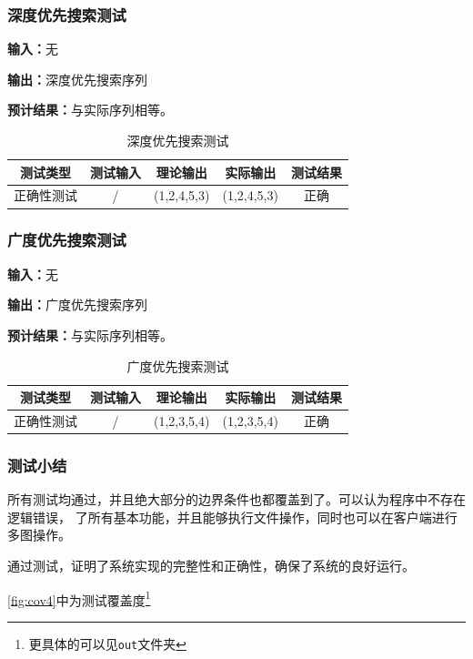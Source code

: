 \subsubsection{深度优先搜索测试}
\textbf{输入：}无
\par
\textbf{输出：}深度优先搜索序列
\par
\textbf{预计结果：}与实际序列相等。
\begin{table}[h]
    \caption{深度优先搜索测试}
    \centering
    \begin{tabular}{@{}ccccc@{}}
        \toprule
        \multicolumn{1}{c}{测试类型}    & \multicolumn{1}{c}{测试输入} & \multicolumn{1}{c}{理论输出} & \multicolumn{1}{c}{实际输出} &
        \multicolumn{1}{c}{测试结果} \\ \midrule
        \multicolumn{1}{c|}{正确性测试}  & /&(1,2,4,5,3)&(1,2,4,5,3)&正确\\ \bottomrule
    \end{tabular}
    \label{tab:traversetest4}
\end{table}
\subsubsection{广度优先搜索测试}
\textbf{输入：}无
\par
\textbf{输出：}广度优先搜索序列
\par
\textbf{预计结果：}与实际序列相等。
\begin{table}[h]
    \caption{广度优先搜索测试}
    \centering
    \begin{tabular}{@{}ccccc@{}}
        \toprule
        \multicolumn{1}{c}{测试类型}    & \multicolumn{1}{c}{测试输入} & \multicolumn{1}{c}{理论输出} & \multicolumn{1}{c}{实际输出} &
        \multicolumn{1}{c}{测试结果} \\ \midrule
        \multicolumn{1}{c|}{正确性测试}  & /&(1,2,3,5,4)&(1,2,3,5,4)&正确\\ \bottomrule
    \end{tabular}
    \label{tab:bfs4}
\end{table}

\subsubsection{测试小结}
所有测试均通过，并且绝大部分的边界条件也都覆盖到了。可以认为程序中不存在逻辑错误，
了所有基本功能，并且能够执行文件操作，同时也可以在客户端进行多图操作。
\par
通过测试，证明了系统实现的完整性和正确性，确保了系统的良好运行。
\par
\autoref{fig:cov4}中为测试覆盖度\footnote{更具体的可以见\texttt{out}文件夹}

